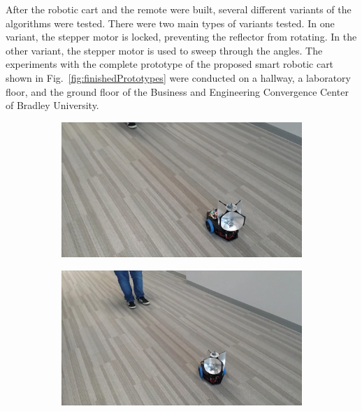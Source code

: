 \documentclass[conference]{IEEEtran}
\begin{document}
After the robotic cart and the remote were built, several different variants of
the algorithms were tested. There were two main types of variants tested. In one
variant, the stepper motor is locked, preventing the reflector from rotating. In
the other variant, the stepper motor is used to sweep through the angles. The
experiments with the complete prototype of the proposed smart robotic cart shown
in Fig.~\ref{fig:finishedPrototypes} were conducted on a hallway, a laboratory
floor, and the ground floor of the Business and Engineering Convergence Center
of Bradley University. %
%
\begin{figure}[htbp]
  \centering
  \begin{subfigure}[b]{0.24\linewidth}
    \centering
    \includegraphics[width=\textwidth]{videos/frames/71.jpeg} 
    \caption{}
    \label{fig:71}
  \end{subfigure}
  \begin{subfigure}[b]{0.24\linewidth}
    \centering
    \includegraphics[width=\textwidth]{videos/frames/141.jpeg} 
    \caption{}
    \label{fig:141}
  \end{subfigure}
  \begin{subfigure}[b]{0.24\linewidth}

\end{subfigure}
\end{figure}
\end{document}
